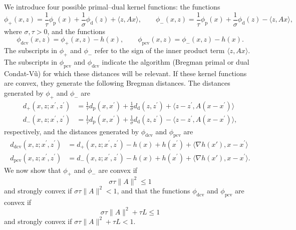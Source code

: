 \documentclass[letterpaper,11pt]{article}
\newcommand{\BEQ}{\begin{equation}}
\newcommand{\EEQ}{\end{equation}}
\newcommand{\inprod}[2]{\langle#1, #2\rangle}
\newcommand{\primal}{\mathrm p}
\newcommand{\dual}{\mathrm d}
\begin{document}
We introduce four possible primal--dual kernel functions: the functions
\[
\phi_+(x,z) = \frac{1}{\tau}\phi_\primal(x)
+\frac{1}{\sigma}\phi_\dual(z)+\inprod{z}{Ax}, \qquad
\phi_-(x,z) = \frac{1}{\tau}\phi_\primal(x)
+\frac{1}{\sigma}\phi_\dual(z)-\inprod{z}{Ax},
\]
where $\sigma,\tau > 0$, and the functions 
\[
 \phi_\mathrm{dcv}(x,z) = \phi_+(x,z) - h(x), \qquad 
 \phi_\mathrm{pcv}(x,z) = \phi_-(x,z) - h(x).
\]
The subscripts in $\phi_+$ and $\phi_-$ 
refer to the sign of the inner product term $\inprod{z}{Ax}$.
The subscripts in $\phi_\mathrm{pcv}$ and $\phi_\mathrm{dcv}$
indicate the algorithm (Bregman primal or dual Condat-V\~u) for which
these distances will be relevant. 
If these kernel functions are convex,
they generate the following Bregman distances.
The distances generated by $\phi_+$ and $\phi_-$ are
\begin{align}
d_+ (x,z;x^\prime,z^\prime) &= 
  \frac{1}{\tau}d_\primal(x,x^\prime)+\frac{1}{\sigma}d_\dual(z,z^\prime)
  +\inprod{z-z^\prime}{A(x-x^\prime)} \nonumber \\
d_-(x,z;x^\prime,z^\prime) &=
  \frac{1}{\tau}d_\primal(x,x^\prime)+\frac{1}{\sigma}d_\dual(z,z^\prime)
  -\inprod{z-z^\prime}{A(x-x^\prime)}, \label{e-bcv-dminus}
\end{align}
respectively, and the distances generated by $\phi_\mathrm{dcv}$ and 
$\phi_\mathrm{pcv}$ are  
\begin{align*}
d_\mathrm{dcv}(x,z;x^\prime,z^\prime) &= 
  d_+ (x,z;x^\prime,z^\prime) 
  -h(x)+h(x^\prime)+\inprod{\nabla h(x')}{x-x^\prime} \\
d_\mathrm{pcv}(x,z;x^\prime,z^\prime) &= 
  d_- (x,z;x^\prime,z^\prime) 
  -h(x)+h(x^\prime)+\inprod{\nabla h(x')}{x-x^\prime}.
\end{align*}
We now show that $\phi_+$ and $\phi_-$ are convex if
\[
\sigma\tau \|A\|^2 \leq 1 
\]
and strongly convex if $\sigma\tau\|A\|^2 < 1$,
and that the functions $\phi_\mathrm{dcv}$ and 
$\phi_\mathrm{pcv}$ are convex if
\BEQ \label{e-bcv-param}
\sigma\tau \|A\|^2 + \tau L \leq 1
\EEQ
and strongly convex if $\sigma\tau \|A\|^2 + \tau L < 1$.
\end{document}
